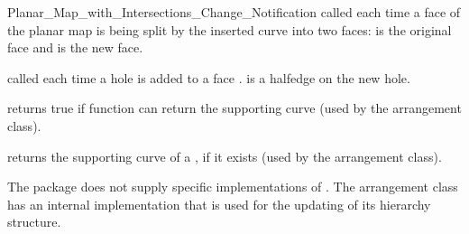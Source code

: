 \begin{ccRefConcept}{Planar_Map_with_Intersections_Change_Notification}
  {called each time a face of the planar map is being split by
  the inserted curve into two faces:  is the
  original face and  is the new face.
  }

  {called each time a hole is added to a face .
   is a halfedge on the new hole.
  }

  {returns true if  function can return the
  supporting curve (used by the arrangement class).
  }

  {returns the supporting curve of a , if it exists
  (used by the arrangement class).
  }


\ccHasModels
  The package does not supply specific implementations of
  . The arrangement class has an
  internal implementation that is used for the updating of its
  hierarchy structure.

\end{ccRefConcept}

\ccRefPageEnd
